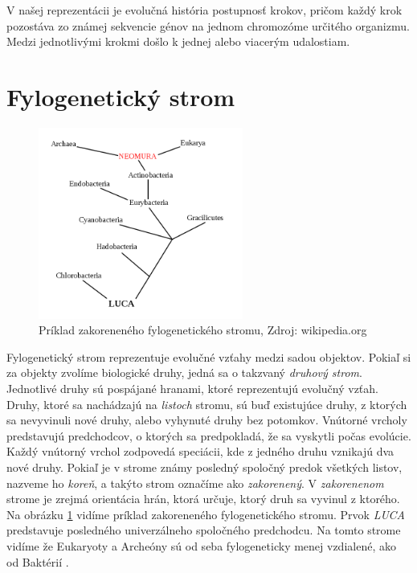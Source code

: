V našej reprezentácii je evolučná história postupnosť krokov, pričom každý krok pozostáva zo známej sekvencie génov na jednom chromozóme určitého organizmu.
Medzi jednotlivými krokmi došlo k jednej alebo viacerým udalostiam. 

\section{Fylogenetický strom}

\begin{figure}[h]
 \centering
\includegraphics[width=0.6\textwidth]{images/rooted}
\caption{Príklad zakoreneného fylogenetického stromu, Zdroj:  wikipedia.org}\label{obr:rooted}
\end{figure}

Fylogenetický strom reprezentuje evolučné vzťahy medzi sadou objektov. Pokiaľ si za objekty zvolíme biologické druhy, jedná sa o takzvaný \emph{druhový strom}.
Jednotlivé druhy sú pospájané hranami, ktoré reprezentujú evolučný vzťah.
Druhy, ktoré sa nachádzajú na \emph{listoch} stromu, sú buď existujúce druhy, z ktorých sa nevyvinuli nové druhy, alebo vyhynuté druhy bez potomkov.  
Vnútorné vrcholy predstavujú predchodcov, o ktorých sa predpokladá, že sa vyskytli počas evolúcie. 
Každý vnútorný vrchol zodpovedá speciácii, kde z jedného druhu vznikajú dva nové druhy.
Pokiaľ je v strome známy posledný spoločný predok všetkých listov, nazveme ho \emph{koreň}, a takýto strom označíme ako \emph{zakorenený}.
V \emph{zakorenenom} strome je zrejmá orientácia hrán, ktorá určuje, ktorý druh sa vyvinul z ktorého.
Na obrázku \ref{obr:rooted} vidíme príklad zakoreneného fylogenetického stromu. Prvok \emph{LUCA} predstavuje posledného univerzálneho spoločného predchodcu.
Na tomto strome vidíme že Eukaryoty a Archeóny sú od seba fylogeneticky menej vzdialené, ako od Baktérií \cite{wiki:phylo}.



